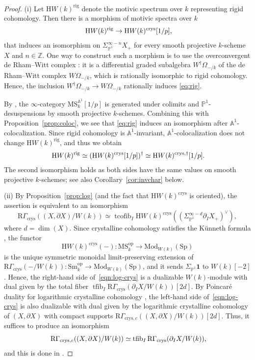 \documentclass{amsart}
\numberwithin{equation}{section}
\theoremstyle{plain}
\theoremstyle{definition}
\let\bb=\mathbb
\def\Z{\bb Z}
\def\A{\bb A}
\def\P{\bb P}
\def\1{\mathbf 1}
\def\ph{\mathord-}
\def\HH{\mathrm{H}}
\let\cat=\mathrm
\def\Mod{\cat{M}\mathrm{od}{}}
\def\Sm{{\cat{S}\mathrm{m}}}
\def\op{\mathrm{op}}
\def\MS{\mathrm{MS}}
\def\Sp{\mathrm{Sp}}
\def\rig{\mathrm{rig}}
\newcommand{\crys}{\mathrm{crys}}
\begin{document}
\begin{proof}
(i) Let $\HH W(k)^\rig$ denote the motivic spectrum over $k$ representing rigid cohomology.
Then there is a morphism of motivic spectra over $k$
\begin{equation}\label{eq:rig}
	\HH W(k)^\rig \to \HH W(k)^\crys[1/p] \rlap, 
\end{equation}
that induces an isomorphism on $\Sigma^{\infty-n}_{\P^1}X_+$ for every smooth projective $k$-scheme $X$ and $n\in\Z$.
One way to construct such a morphism is to use the overconvergent de Rham--Witt complex \cite{DLZ}: it is a differential graded subalgebra $W^\dagger\Omega_{\ph/k}$ of the de Rham--Witt complex $W\Omega_{\ph/k}$, which is rationally isomorphic to rigid cohomology.
Hence, the inclusion $W^\dagger\Omega_{\ph/k}\to W\Omega_{\ph/k}$ rationally induces \eqref{eq:rig}.

By \cite[Proposition~B.1]{LYZ}, the $\infty$-category $\MS_k^{\A^1}[1/p]$ is generated under colimits and $\P^1$-desus\-pen\-sions by smooth projective $k$-schemes.
Combining this with Proposition~\ref{prop:coloc}, we see that \eqref{eq:rig} induces an isomorphism after $\A^1$-colocalization.
Since rigid cohomology is $\A^1$-invariant, $\A^1$-colocalization does not change $\HH W(k)^\rig$, and thus we obtain
\[
	\HH W(k)^\rig \simeq (\HH W(k)^\crys[1/p])^\dagger \simeq \HH W(k)^{\crys,\dagger}[1/p] \rlap.
\]
The second isomorphism holds as both sides have the same values on smooth projective $k$-schemes; see also Corollary~\ref{cor:invchar} below.

(ii) By Proposition~\ref{prop:log} (and the fact that $\HH W(k)^\crys$ is oriented), the assertion is equivalent to an isomorphism
\begin{equation}\label{eqn:log-crys}
	\mathrm{R}\Gamma_\crys((X,\partial X)/W(k)) \simeq \operatorname{tcofib}_I\HH W(k)^\crys((\Sigma_{\P^1}^{\infty-d}\partial_IX_+)^\vee),
\end{equation}
where $d=\dim(X)$.
Since crystalline cohomology satisfies the Künneth formula \cite[Remark 4.1.8]{BhattLurie}, the functor
\[
\HH W(k)^\crys(\ph)\colon \MS_k^\op \to \Mod_{W(k)}(\Sp)
\]
is the unique symmetric monoidal limit-preserving extension of $\mathrm{R}\Gamma_\crys(\ph/W(k))\colon \Sm_k^\op\to \Mod_{W(k)}(\Sp)$,
and it sends $\Sigma_{\P^1}\1$ to $W(k)[-2]$.
Hence, the right-hand side of~\eqref{eqn:log-crys} is a dualizable $W(k)$-module with dual given by the total fiber $\operatorname{tfib}_I\mathrm{R}\Gamma_\crys(\partial_IX/W(k))[2d]$. By Poincaré duality for logarithmic crystalline cohomology \cite{Tsuji}, the left-hand side of~\eqref{eqn:log-crys} is also dualizable with dual given by the logarithmic crystalline cohomology of $(X,\partial X)$ with compact supports $\mathrm{R}\Gamma_{\crys,c}((X,\partial X)/W(k))[2d]$. Thus, it suffices to produce an isomorphism
\[
	\mathrm{R}\Gamma_{\crys,c}((X,\partial X)/W(k)) \simeq \operatorname{tfib}_I\mathrm{R}\Gamma_\crys(\partial_IX/W(k)) \rlap,
\]
and this is done in \cite[(2.11.9.1)]{NS}.
\end{proof}
\end{document}
